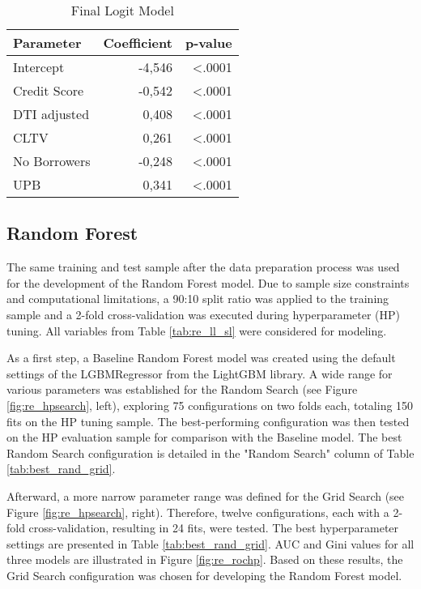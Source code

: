 \begin{table}[H]
\centering
\begin{tabular}{lrr}\toprule
\textbf{Parameter}     	& \textbf{Coefficient} & \textbf{p-value} \\\midrule
Intercept          		& -4,546               & \textless{}.0001 \\
Credit Score       		& -0,542               & \textless{}.0001 \\
DTI adjusted       		& 0,408                & \textless{}.0001 \\
CLTV               		& 0,261                & \textless{}.0001 \\
No Borrowers       		& -0,248               & \textless{}.0001 \\
UPB                		& 0,341                & \textless{}.0001\\\bottomrule
\end{tabular}
\caption{Final Logit Model}
\label{tab:re_finalLogModel}
\end{table}

\newpage
\subsection{Random Forest}
\label{sec:randfor}
The same training and test sample after the data preparation process was used for the development of the Random Forest model. Due to sample size constraints and computational limitations, a 90:10 split ratio was applied to the training sample and a 2-fold cross-validation was executed during hyperparameter (HP) tuning. All variables from Table \ref{tab:re_ll_sl} were considered for modeling.

As a first step, a Baseline Random Forest model was created using the default settings of the LGBMRegressor from the LightGBM library. A wide range for various parameters was established for the Random Search (see Figure \ref{fig:re_hpsearch}, left), exploring 75 configurations on two folds each, totaling 150 fits on the HP tuning sample. The best-performing configuration was then tested on the HP evaluation sample for comparison with the Baseline model. The best Random Search configuration is detailed in the "Random Search" column of Table \ref{tab:best_rand_grid}. 

Afterward, a more narrow parameter range was defined for the Grid Search (see Figure \ref{fig:re_hpsearch}, right). Therefore, twelve configurations, each with a 2-fold cross-validation, resulting in 24 fits, were tested. The best hyperparameter settings are presented in Table \ref{tab:best_rand_grid}. AUC and Gini values for all three models are illustrated in Figure \ref{fig:re_rochp}. Based on these results, the Grid Search configuration was chosen for developing the Random Forest model.

